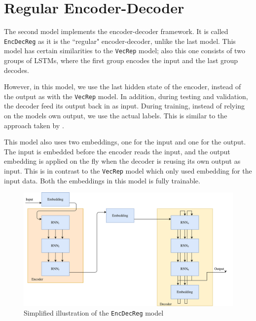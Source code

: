 
\section{Regular Encoder-Decoder}
\label{sec:regular_encoder_decoder}
The second model implements the encoder-decoder framework. It is called {\tt EncDecReg} as it is the ``regular" encoder-decoder, unlike the last model. This model has certain similarities to the {\tt VecRep} model; also this one consists of two groups of LSTMs, where the first group encodes the input and the last group decodes.

However, in this model, we use the last hidden state of the encoder, instead of the output as with the {\tt VecRep} model. In addition, during testing and validation, the decoder feed its output back in as input. During training, instead of relying on the models own output, we use the actual labels. This is similar to the approach taken by \citep{bengio2015scheduled}.

This model also uses two embeddings, one for the input and one for the output. The input is embedded before the encoder reads the input, and the output embedding is applied on the fly when the decoder is reusing its own output as input. This is in contrast to the {\tt VecRep} model which only used embedding for the input data. Both the embeddings in this model is fully trainable.

\begin{figure}[!ht]
    \centering
    \includegraphics[width=1\textwidth]{fig/models/encdecreg_model.png}
    \caption{Simplified illustration of the {\tt EncDecReg} model}
    \label{fig:encdecreg_model}
\end{figure}

